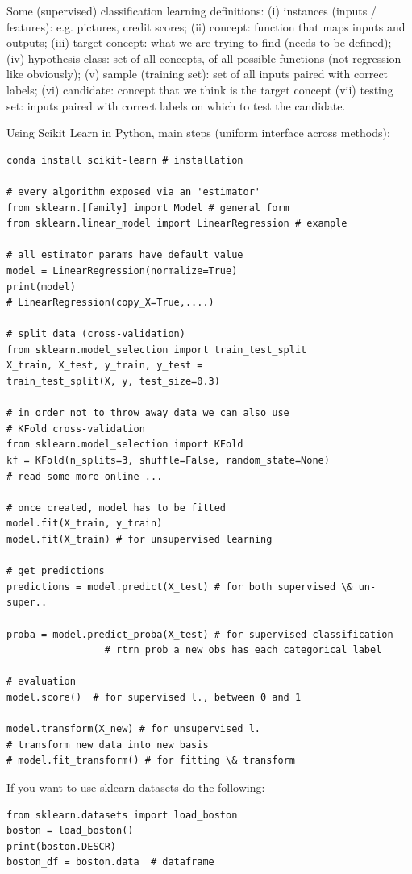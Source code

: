 \documentclass[11pt]{article}
\begin{document}
Some (supervised) classification learning definitions: (i) instances (inputs / features): e.g. pictures, credit scores; (ii) concept: function that maps inputs and outputs; (iii) target concept: what we are trying to find (needs to be defined); (iv) hypothesis class: set of all concepts, of all possible functions (not regression like obviously); (v) sample (training set): set of all inputs paired with correct labels; (vi) candidate: concept that we think is the target concept (vii) testing set: inputs paired with correct labels on which to test the candidate. 

Using Scikit Learn in Python, main steps (uniform interface across methods):
\begin{lstlisting}
conda install scikit-learn # installation

# every algorithm exposed via an 'estimator'
from sklearn.[family] import Model # general form
from sklearn.linear_model import LinearRegression # example

# all estimator params have default value
model = LinearRegression(normalize=True)
print(model)
# LinearRegression(copy_X=True,....)

# split data (cross-validation)
from sklearn.model_selection import train_test_split
X_train, X_test, y_train, y_test = 
train_test_split(X, y, test_size=0.3)

# in order not to throw away data we can also use
# KFold cross-validation
from sklearn.model_selection import KFold
kf = KFold(n_splits=3, shuffle=False, random_state=None)
# read some more online ...

# once created, model has to be fitted
model.fit(X_train, y_train)
model.fit(X_train) # for unsupervised learning

# get predictions
predictions = model.predict(X_test) # for both supervised \& un-super..

proba = model.predict_proba(X_test) # for supervised classification
                 # rtrn prob a new obs has each categorical label      

# evaluation
model.score()  # for supervised l., between 0 and 1

model.transform(X_new) # for unsupervised l.
# transform new data into new basis
# model.fit_transform() # for fitting \& transform
\end{lstlisting} 

If you want to use sklearn datasets do the following:
\begin{lstlisting}
from sklearn.datasets import load_boston
boston = load_boston()
print(boston.DESCR)
boston_df = boston.data  # dataframe
\end{lstlisting} 
\end{document}
